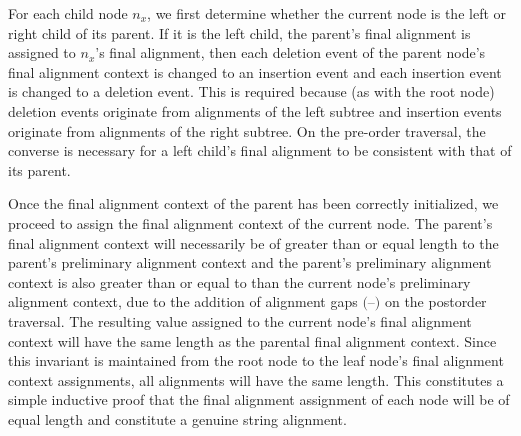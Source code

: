 \documentclass[11pt]{article}
\newcommand*\gap{\textrm{(--)}}
\begin{document}
For each child node $n_x$, we first determine whether the current node is the left or right child of its parent.
If it is the left child, the parent's final alignment is assigned to $n_x$'s final alignment, then each deletion event of the parent node's final alignment context is changed to an insertion event and each insertion event is changed to a deletion event.
This is required because (as with the root node) deletion events originate from alignments of the left subtree and insertion events originate from alignments of the right subtree. On the pre-order traversal, the converse is necessary for a left child's final alignment to be consistent with that of its parent.

Once the final alignment context of the parent has been correctly initialized, we proceed to assign the final alignment context of the current node.
The parent's final alignment context will necessarily be of greater than or equal length to the parent's preliminary alignment context and the parent's preliminary alignment context is also greater than or equal to than the current node's preliminary alignment context, due to the addition of alignment gaps $\gap$ on the postorder traversal.
The resulting value assigned to the current node's final alignment context will have the same length as the parental final alignment context.
Since this invariant is maintained from the root node to the leaf node's final alignment context assignments, all alignments will have the same length.
This constitutes a simple inductive proof that the final alignment assignment of each node will be of equal length and constitute a genuine string alignment.
\end{document}
